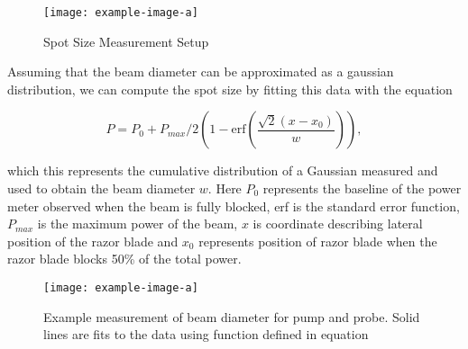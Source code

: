 \begin{figure}[h]
	\centering
	\texttt{[image: example-image-a]}
	\caption{Spot Size Measurement Setup}
	\label{fig:beam_diameter_setup}
\end{figure}

Assuming that the beam diameter can be approximated as a gaussian distribution, we can compute the spot size by fitting this data with the equation 

\begin{equation}
	P = P_0 + P_{max}/2 \left( 1 - \mathrm{erf} \left( \dfrac{\sqrt{2}(x - x_0)}{w} \right) \right),
\end{equation}

which this represents the cumulative distribution of a Gaussian measured and used to obtain the beam diameter $w$. Here $P_0$ represents the baseline of the power meter observed when the beam is fully blocked, erf is the standard error function, $P_{max}$ is the maximum power of the beam, $x$ is coordinate describing lateral position of the razor blade and $x_0$ represents position of razor blade when the razor blade blocks 50\% of the total power.  



\begin{figure}[h]
	\centering
	\texttt{[image: example-image-a]}
	\caption{Example measurement of beam diameter for pump and probe. Solid lines are fits to the data using function defined in equation}
		\label{fig:beam_diamter_measurement}
\end{figure}



